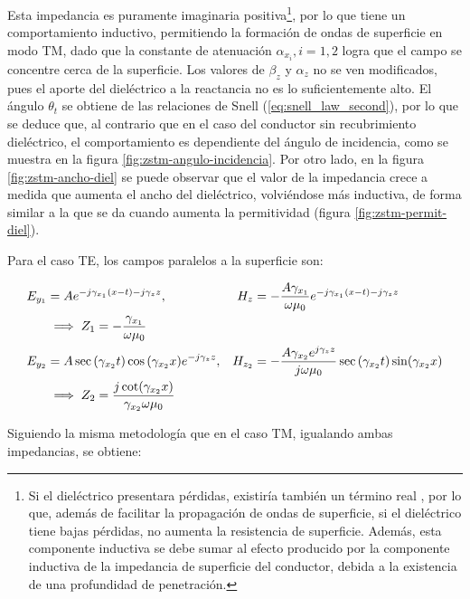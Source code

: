 
Esta impedancia es puramente imaginaria positiva\footnote{Si el dieléctrico presentara pérdidas, existiría también un término real \cite{Barlow:SurfaceWaves}, por lo que, además de facilitar la propagación de ondas de superficie, si el dieléctrico tiene bajas pérdidas, no aumenta la resistencia de superficie. Además, esta componente inductiva se debe sumar al efecto producido por la componente inductiva de la impedancia de superficie del conductor, debida a la existencia de una profundidad de penetración.}, por lo que tiene un comportamiento inductivo, permitiendo la formación de ondas de superficie en modo TM, dado que la constante de atenuación $\alpha_{x_i}, i=1,2$ logra que el campo se concentre cerca de la superficie. Los valores de $\beta_z$ y $\alpha_z$ no se ven modificados, pues el aporte del dieléctrico a la reactancia no es lo suficientemente alto. El ángulo $\theta_t$ se obtiene de las relaciones de Snell (\ref{eq:snell_law_second}), por lo que se deduce que, al contrario que en el caso del conductor sin recubrimiento dieléctrico, el comportamiento es dependiente del ángulo de incidencia, como se muestra en la figura \ref{fig:zstm-angulo-incidencia}. Por otro lado, en la figura \ref{fig:zstm-ancho-diel} se puede observar que el valor de la impedancia crece a medida que aumenta el ancho del dieléctrico, volviéndose más inductiva, de forma similar a la que se da cuando aumenta la permitividad (figura \ref{fig:zstm-permit-diel}).

Para el caso TE, los campos paralelos a la superficie son:

\begin{align}
	E_{y_1} &= A e^{-j\gamma_{x_1}(x-t)-j\gamma_z z}, &H_z &= -\frac{A \gamma_{x_1}}{\omega \mu_0} e^{-j\gamma_{x_1}(x-t)-j\gamma_z z} \notag \\
	&\implies Z_{1} = -\frac{\gamma_{x_1}}{\omega \mu_0} \\
	E_{y_2} &= A \sec{(\gamma_{x_2} t)} \cos{(\gamma_{x_2} x)} e^{-j \gamma_z z}, &H_{z_2} &= -\frac{A \gamma_{x_2} e^{j\gamma_z z}}{j\omega \mu_0} \sec{(\gamma_{x_2} t)} \sin(\gamma_{x_2} x) \notag \\
	&\implies Z_{2} = \frac{j\cot(\gamma_{x_2} x)}{\gamma_{x_2} \omega \mu_0}
\end{align}

Siguiendo la misma metodología que en el caso TM, igualando ambas impedancias, se obtiene:

